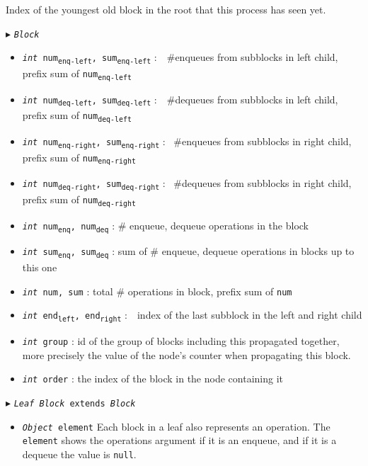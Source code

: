 \documentclass[10pt]{article}
\theoremstyle{definition}
\begin{document}
\begin{algorithm}
\begin{algorithmic}[1]
\begin{multicols}{2}
\begin{itemize}
  \textsf{Index of the youngest old block in the root that this process has seen yet.}
  
\end{itemize}


\Statex $\blacktriangleright$ \texttt{\textsl{Block}}

\begin{itemize}
  \item \texttt{\textsl{int} num\textsubscript{enq-left}, sum\textsubscript{enq-left}}
  \textsf{:~~\#enqueues from subblocks in left child, prefix sum of \texttt{num\textsubscript{enq-left}}}
  \item \texttt{\textsl{int} num\textsubscript{deq-left}, sum\textsubscript{deq-left}}
  \textsf{:~~\#dequeues from subblocks in left child, prefix sum of \texttt{num\textsubscript{deq-left}}}
  \item \texttt{\textsl{int} num\textsubscript{enq-right}, \texttt{sum\textsubscript{enq-right}}}
  \textsf{: ~\#enqueues from subblocks in right child, prefix sum of \texttt{num\textsubscript{enq-right}}}
  \item \texttt{\textsl{int} num\textsubscript{deq-right}, \texttt{sum\textsubscript{deq-right}}}
  \textsf{: ~\#dequeues from subblocks in right child, prefix sum of \texttt{num\textsubscript{deq-right}}}
  \item \texttt{\textsl{int} num\textsubscript{enq}, num\textsubscript{deq}}
  \textsf{: \# enqueue, dequeue operations in the block}
  \item \texttt{\textsl{int} sum\textsubscript{enq}, sum\textsubscript{deq}}
  \textsf{: sum of \# enqueue, dequeue operations in blocks up to this one}
  \item \texttt{\textsl{int} num, sum}
  \textsf{: total \# operations in block, prefix sum of \texttt{num}}
  \item \texttt{\textsl{int} end\textsubscript{left}, end\textsubscript{right}}
  \textsf{:~~index of the last subblock in the left and right child}
  \item \texttt{\textsl{int} group}
  \textsf{: id of the group of blocks including this propagated together, more precisely the value of the node's counter when propagating this block.}
  \item \texttt{\textsl{int} order}
  \textsf{: the index of the block in the node containing it}
\end{itemize}

\pagebreak

\Statex $\blacktriangleright$ \texttt{\textsl{Leaf Block} extends \textsl{Block}}
\begin{itemize}
  \item \texttt{\textsl{Object} element}
  \textsf{Each block in a leaf also represents an operation. The \texttt{element} shows the operations argument if it is an enqueue, and if it is a dequeue the value is \texttt{null}.}
\end{itemize}


\end{multicols}
\end{algorithmic}
\end{algorithm}
\end{document}
